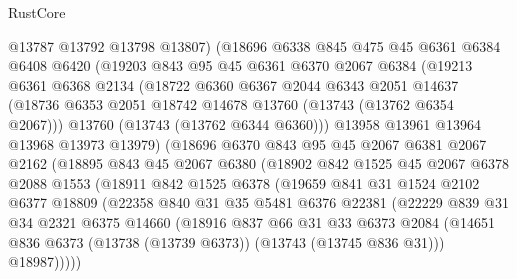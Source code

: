 \begin{lexlean}{RustCore}
\begin{coremodule}
            @13787
            @13792
            @13798
            @13807)
          (@18696
            @6338
            @845
            @475
            @45
            @6361
            @6384
            @6408
            @6420
            (@19203
              @843
              @95
              @45
              @6361
              @6370
              @2067
              @6384
              (@19213
                @6361
                @6368
                @2134
                (@18722
                  @6360
                  @6367
                  @2044
                  @6343
                  @2051
                  @14637
                  (@18736 @6353 @2051 @18742 @14678 @13760 (@13743 (@13762 @6354 @2067)))
                  @13760
                  (@13743 (@13762 @6344 @6360)))
                @13958
                @13961
                @13964
                @13968
                @13973
                @13979)
              (@18696
                @6370
                @843
                @95
                @45
                @2067
                @6381
                @2067
                @2162
                (@18895
                  @843
                  @45
                  @2067
                  @6380
                  (@18902
                    @842
                    @1525
                    @45
                    @2067
                    @6378
                    @2088
                    @1553
                    (@18911
                      @842
                      @1525
                      @6378
                      (@19659
                        @841
                        @31
                        @1524
                        @2102
                        @6377
                        @18809
                        (@22358
                          @840
                          @31
                          @35
                          @5481
                          @6376
                          @22381
                          (@22229
                            @839
                            @31
                            @34
                            @2321
                            @6375
                            @14660
                            (@18916
                              @837
                              @66
                              @31
                              @33
                              @6373
                              @2084
                              (@14651 @836 @6373 (@13738 (@13739 @6373)) (@13743 (@13745 @836 @31)))
                              @18987)))))

\end{coremodule}
\end{lexlean}
